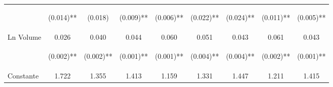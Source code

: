 \documentclass[12pt,a4paper]{article}
\begin{document}
\begin{table}[h]
\begin{tabular}{lcccccccc}
  & \begin{scriptsize}(0.014)**\end{scriptsize} &\begin{scriptsize}(0.018)\end{scriptsize} & \begin{scriptsize}(0.009)**\end{scriptsize} & \begin{scriptsize}(0.006)**\end{scriptsize} & \begin{scriptsize}(0.022)**\end{scriptsize} & \begin{scriptsize}(0.024)**\end{scriptsize} & \begin{scriptsize}(0.011)**\end{scriptsize} & \begin{scriptsize}(0.005)**\end{scriptsize}\\
  Ln Volume    & 0.026 & 0.040 & 0.044 & 0.060 & 0.051 & 0.043 & 0.061 & 0.043 \\
  & \begin{scriptsize}(0.002)**\end{scriptsize} &\begin{scriptsize}(0.002)**\end{scriptsize} & \begin{scriptsize}(0.001)**\end{scriptsize}& \begin{scriptsize}(0.001)**\end{scriptsize} & \begin{scriptsize}(0.004)**\end{scriptsize} & \begin{scriptsize}(0.004)**\end{scriptsize} & \begin{scriptsize}(0.002)**\end{scriptsize} & \begin{scriptsize}(0.001)**\end{scriptsize}\\
  Constante    & 1.722 & 1.355 & 1.413 & 1.159 & 1.331 & 1.447 & 1.211 & 1.415 \\

\end{tabular}
\end{table}
\end{document}
